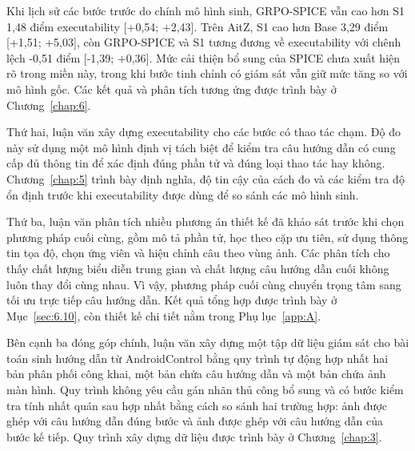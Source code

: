 Khi lịch sử các bước trước do chính mô hình sinh, GRPO-SPICE vẫn cao hơn S1 1,48 điểm executability [+0,54; +2,43]. Trên AitZ, S1 cao hơn Base 3,29 điểm [+1,51; +5,03], còn GRPO-SPICE và S1 tương đương về executability với chênh lệch -0,51 điểm [-1,39; +0,36]. Mức cải thiện bổ sung của SPICE chưa xuất hiện rõ trong miền này, trong khi bước tinh chỉnh có giám sát vẫn giữ mức tăng so với mô hình gốc. Các kết quả và phân tích tương ứng được trình bày ở Chương~\ref{chap:6}.

Thứ hai, luận văn xây dựng executability cho các bước có thao tác chạm. Độ đo này sử dụng một mô hình định vị tách biệt để kiểm tra câu hướng dẫn có cung cấp đủ thông tin để xác định đúng phần tử và đúng loại thao tác hay không. Chương~\ref{chap:5} trình bày định nghĩa, độ tin cậy của cách đo và các kiểm tra độ ổn định trước khi executability được dùng để so sánh các mô hình sinh.

Thứ ba, luận văn phân tích nhiều phương án thiết kế đã khảo sát trước khi chọn phương pháp cuối cùng, gồm mô tả phần tử, học theo cặp ưu tiên, sử dụng thông tin tọa độ, chọn ứng viên và hiệu chỉnh câu theo vùng ảnh. Các phân tích cho thấy chất lượng biểu diễn trung gian và chất lượng câu hướng dẫn cuối không luôn thay đổi cùng nhau. Vì vậy, phương pháp cuối cùng chuyển trọng tâm sang tối ưu trực tiếp câu hướng dẫn. Kết quả tổng hợp được trình bày ở Mục~\ref{sec:6.10}, còn thiết kế chi tiết nằm trong Phụ lục~\ref{app:A}.

Bên cạnh ba đóng góp chính, luận văn xây dựng một tập dữ liệu giám sát cho bài toán sinh hướng dẫn từ AndroidControl bằng quy trình tự động hợp nhất hai bản phân phối công khai, một bản chứa câu hướng dẫn và một bản chứa ảnh màn hình. Quy trình không yêu cầu gán nhãn thủ công bổ sung và có bước kiểm tra tính nhất quán sau hợp nhất bằng cách so sánh hai trường hợp: ảnh được ghép với câu hướng dẫn đúng bước và ảnh được ghép với câu hướng dẫn của bước kế tiếp. Quy trình xây dựng dữ liệu được trình bày ở Chương~\ref{chap:3}.
